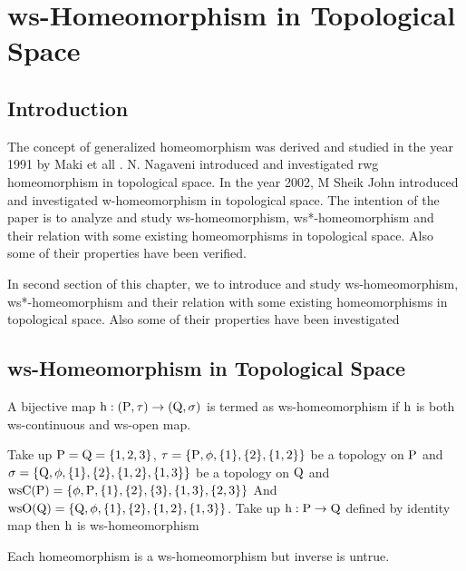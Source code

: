 \chapter{ws-Homeomorphism in Topological Space}
\graphicspath{{Chapter5/Chapter5Figs/EPS/}{Chapter5/Chapter5Figs/}}

\section{Introduction}\label{sec5.1}

The concept of generalized homeomorphism was derived and studied in the year 1991 by Maki et all \cite{Maki5}. N. Nagaveni \cite{Nagaveni5} introduced and investigated rwg homeomorphism in topological space. In the year 2002, M Sheik John \cite{Sheik1} introduced and investigated w-homeomorphism in topological space. The intention of the paper is to analyze and study ws-homeomorphism, ws*-homeomorphism and their relation with some existing homeomorphisms in topological space. Also some of their properties have been verified.

In second section of this chapter, we to introduce and study ws-homeomorphism, ws*-homeomorphism and their relation with some existing homeomorphisms in topological space. Also some of their properties have been investigated

\section{ws-Homeomorphism in Topological Space}\label{sec5.2}

\begin{dfn}\label{defi5.2.1}
A bijective map $\mathrm{h}: (\mathrm{P},\tau)\to (\mathrm{Q},\sigma)$ is termed as ws-homeomor\-phism if $\mathrm{h}$ is both ws-continuous and ws-open map.
\end{dfn}

\begin{exm}\label{exam5.2.1} 
Take up $\mathrm{P}=\mathrm{Q}=\{1,2,3\}$, $\tau =\{\mathrm{P}, \phi,\{1\},\{2\},\{1,2\}\}$ be a topology on $\mathrm{P}$ and $\sigma =\{\mathrm{Q},\phi,\{1\},\{2\},\{1,2\},\{1,3\}\}$ be a topology on $\mathrm{Q}$ and $\mathrm{ws}\mathrm{C}(\mathrm{P})= \{\phi, \mathrm{P}, \{1\}, \{2\},\{3\}, \{1, 3\},\{2, 3\}\}$ And $\mathrm{ws}\mathrm{O}(\mathrm{Q}) =\{\mathrm{Q}, \phi,\{1\},\{2\},\{1,2\},\{1,3\}\}$. Take up $\mathrm{h}: \mathrm{P}\to \mathrm{Q}$ defined by identity map then $\mathrm{h}$ is ws-homeomorphism 
\end{exm}

\begin{thm}\label{thm5.2.1}
Each homeomorphism is a ws-homeomorphism but inverse is untrue.
\end{thm}

